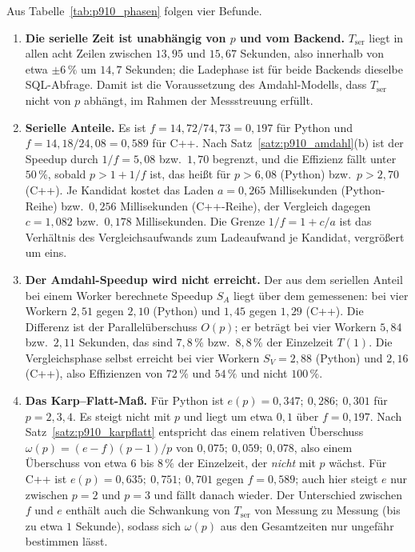 \documentclass[a4paper,12pt, twoside]{report}
\theoremstyle{definition}
\begin{document}
Aus Tabelle~\ref{tab:p910_phasen} folgen vier Befunde.

\begin{enumerate}[label=(\arabic*)]
\item \textbf{Die serielle Zeit ist unabhängig von $p$ und vom Backend.} $T_{\mathrm{ser}}$ liegt in allen acht Zeilen zwischen $13{,}95$ und $15{,}67$ Sekunden, also innerhalb von etwa $\pm 6\,\%$ um $14{,}7$ Sekunden; die Ladephase ist für beide Backends dieselbe SQL-Abfrage. Damit ist die Voraussetzung des Amdahl-Modells, dass $T_{\mathrm{ser}}$ nicht von $p$ abhängt, im Rahmen der Messstreuung erfüllt.
\item \textbf{Serielle Anteile.} Es ist $f=14{,}72/74{,}73=0{,}197$ für Python und $f=14{,}18/24{,}08=0{,}589$ für C++. Nach Satz~\ref{satz:p910_amdahl}(b) ist der Speedup durch $1/f=5{,}08$ bzw.\ $1{,}70$ begrenzt, und die Effizienz fällt unter $50\,\%$, sobald $p>1+1/f$ ist, das heißt für $p>6{,}08$ (Python) bzw.\ $p>2{,}70$ (C++). Je Kandidat kostet das Laden $a=0{,}265$ Millisekunden (Python-Reihe) bzw.\ $0{,}256$ Millisekunden (C++-Reihe), der Vergleich dagegen $c=1{,}082$ bzw.\ $0{,}178$ Millisekunden. Die Grenze $1/f=1+c/a$ ist das Verhältnis des Vergleichsaufwands zum Ladeaufwand je Kandidat, vergrößert um eins.
\item \textbf{Der Amdahl-Speedup wird nicht erreicht.} Der aus dem seriellen Anteil bei einem Worker berechnete Speedup $S_A$ liegt über dem gemessenen: bei vier Workern $2{,}51$ gegen $2{,}10$ (Python) und $1{,}45$ gegen $1{,}29$ (C++). Die Differenz ist der Parallelüberschuss $O(p)$; er beträgt bei vier Workern $5{,}84$ bzw.\ $2{,}11$ Sekunden, das sind $7{,}8\,\%$ bzw.\ $8{,}8\,\%$ der Einzelzeit $T(1)$. Die Vergleichsphase selbst erreicht bei vier Workern $S_V=2{,}88$ (Python) und $2{,}16$ (C++), also Effizienzen von $72\,\%$ und $54\,\%$ und nicht $100\,\%$.
\item \textbf{Das Karp--Flatt-Maß.} Für Python ist $e(p)=0{,}347;\ 0{,}286;\ 0{,}301$ für $p=2,3,4$. Es steigt nicht mit $p$ und liegt um etwa $0{,}1$ über $f=0{,}197$. Nach Satz~\ref{satz:p910_karpflatt} entspricht das einem relativen Überschuss $\omega(p)=(e-f)(p-1)/p$ von $0{,}075;\ 0{,}059;\ 0{,}078$, also einem Überschuss von etwa $6$ bis $8\,\%$ der Einzelzeit, der \emph{nicht} mit $p$ wächst. Für C++ ist $e(p)=0{,}635;\ 0{,}751;\ 0{,}701$ gegen $f=0{,}589$; auch hier steigt $e$ nur zwischen $p=2$ und $p=3$ und fällt danach wieder. Der Unterschied zwischen $f$ und $e$ enthält auch die Schwankung von $T_{\mathrm{ser}}$ von Messung zu Messung (bis zu etwa $1$ Sekunde), sodass sich $\omega(p)$ aus den Gesamtzeiten nur ungefähr bestimmen lässt.
\end{enumerate}
\end{document}
